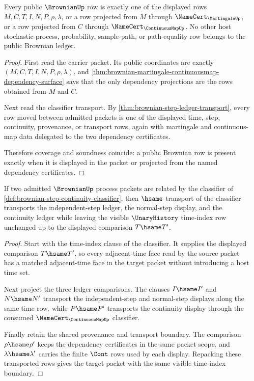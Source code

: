 \begin{theorem}
\label{thm:brownian-ledger-exactness}
Every public $\BrownianUp$ row is exactly one of the displayed rows
$M,C,T,I,N,P,\rho,\lambda$, or a row projected from $M$ through
$\NameCert_{\MartingaleUp}$, or a row projected from $C$ through
$\NameCert_{\ContinuousMapUp}$. No other host stochastic-process, probability,
sample-path, or path-equality row belongs to the public Brownian ledger.
\end{theorem}
\begin{proof}
First read the carrier packet. Its public coordinates are exactly
$(M,C,T,I,N,P,\rho,\lambda)$, and
\autoref{thm:brownian-martingale-continuousmap-dependency-surface} says that
the only dependency projections are the rows obtained from $M$ and $C$.

Next read the classifier transport. By
\autoref{thm:brownian-step-ledger-transport}, every row moved between admitted
packets is one of the displayed time, step, continuity, provenance, or
transport rows, again with martingale and continuous-map data delegated to the
two dependency certificates.

Therefore coverage and soundness coincide: a public Brownian row is present
exactly when it is displayed in the packet or projected from the named
dependency certificates.
\end{proof}

\begin{theorem}
\label{thm:brownian-step-ledger-transport}
If two admitted $\BrownianUp$ process packets are related by the classifier of
\autoref{def:brownian-step-continuity-classifier}, then $\hsame$ transport of
the classifier transports the independent-step ledger, the normal-step
display, and the continuity ledger while leaving the visible
$\UnaryHistory$ time-index row unchanged up to the displayed comparison
$T\hsame T'$.
\end{theorem}
\begin{proof}
Start with the time-index clause of the classifier. It supplies the displayed
comparison $T\hsame T'$, so every adjacent-time face read by the source
packet has a matched adjacent-time face in the target packet without
introducing a host time set.

Next project the three ledger comparisons. The clauses $I\hsame I'$ and
$N\hsame N'$ transport the independent-step and normal-step displays along
the same time row, while $P\hsame P'$ transports the continuity display
through the consumed $\NameCert_{\ContinuousMapUp}$ classifier.

Finally retain the shared provenance and transport boundary. The comparison
$\rho\hsame\rho'$ keeps the dependency certificates in the same packet scope,
and $\lambda\hsame\lambda'$ carries the finite $\Cont$ rows used by each
display. Repacking these transported rows gives the target packet with the
same visible time-index boundary.
\end{proof}

